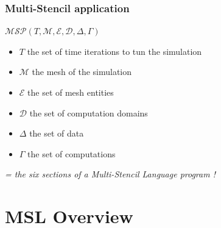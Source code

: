 \documentclass{beamer}
\begin{document}


\begin{frame}
\frametitle{Multi-Stencil application}
\begin{center}
$\mathcal{MSP}(T,\mathcal{M},\mathcal{E},\mathcal{D},\Delta,\Gamma)$
\end{center}
\begin{itemize}
\item $T$ the set of time iterations to tun the simulation
\item $\mathcal{M}$ the mesh of the simulation
\item $\mathcal{E}$ the set of mesh entities
\item $\mathcal{D}$ the set of computation domains
\item $\Delta$ the set of data
\item $\Gamma$ the set of computations
\end{itemize}
\center \textit{= the six sections of a \emph{Multi-Stencil Language} program !}
\end{frame}

\section{MSL Overview}
\end{document}
